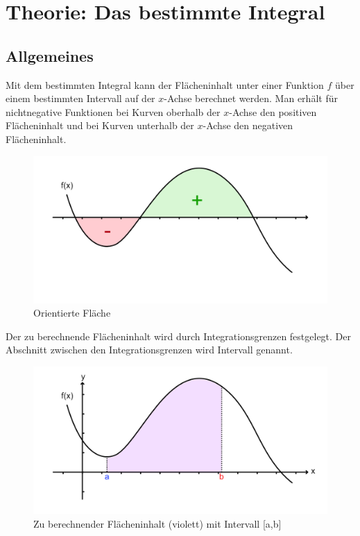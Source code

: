 \documentclass{fhnwreport} %
\begin{document}
\clearpage

\section{Theorie: Das bestimmte Integral}
\subsection{Allgemeines}
Mit dem bestimmten Integral kann der Flächeninhalt unter einer Funktion $f$ über einem bestimmten Intervall auf der $x$-Achse berechnet werden. Man erhält für nichtnegative Funktionen bei Kurven oberhalb der $x$-Achse den positiven Flächeninhalt und bei Kurven unterhalb der $x$-Achse den negativen Flächeninhalt. 

\begin{figure}[!h]
\centering
\includegraphics{orientierte-flaeche}
\caption{Orientierte Fläche}
\label{fig:orientierte_flaeche}
\end{figure}


Der zu berechnende Flächeninhalt wird durch Integrationsgrenzen festgelegt. Der Abschnitt zwischen den Integrationsgrenzen wird Intervall genannt. 

\begin{figure}[!h]
\centering
\includegraphics{flaecheninhalt}
\caption{Zu berechnender Flächeninhalt (violett) mit Intervall [a,b]}
\label{fig:flaecheninhalt_violett}
\end{figure}
\end{document}
